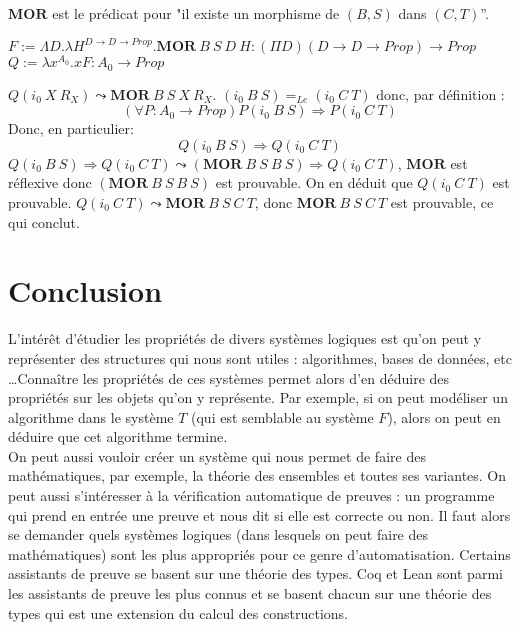 \documentclass[a4paper,12pt]{article}
\theoremstyle{plain}
\begin{document}
$\mathbf{MOR}$ est le prédicat pour "il existe un morphisme de $(B,S)$ dans $(C,T)$''.

\begin{center}
$ F := \Lambda D. \lambda H^{D \to D \to \mathit{Prop}}. \mathbf{MOR} \ B \ S \ D \ H : (\Pi D)(D \to D \to \mathit{Prop}) \to \mathit{Prop}$\\[3mm]
$ Q := \lambda x^{A_0}. x F : A_0 \to \mathit{Prop}$
\end{center}
\vspace{4mm}

$Q (i_0 \ X \ R_X) \leadsto \mathbf{MOR} \ B \ S \ X \ R_X$. $( i_0 \ B \ S) =_{\mathit{Le}}( i_0 \ C \ T)$ donc, par définition :
$$ (\forall P : A_0 \to \mathit{Prop}) P( i_0 \ B \ S) \Rightarrow P( i_0 \ C \ T)$$
Donc, en particulier: 
$$ Q( i_0 \ B \ S) \Rightarrow Q( i_0 \ C \ T)$$
$ Q( i_0 \ B \ S) \Rightarrow Q( i_0 \ C \ T) \leadsto (\mathbf{MOR} \ B \ S \ B \ S) \Rightarrow Q( i_0 \ C \ T)$, $\mathbf{MOR}$ est réflexive donc $(\mathbf{MOR} \ B \ S \ B \ S)$ est prouvable. On en déduit que $Q( i_0 \ C \ T)$ est prouvable. $Q( i_0 \ C \ T) \leadsto \mathbf{MOR} \ B \ S \ C \ T$, donc $\mathbf{MOR} \ B \ S \ C \ T$ est prouvable, ce qui conclut.

\clearpage

\section*{Conclusion}

L'intérêt d'étudier les propriétés de divers systèmes logiques est qu'on peut y représenter des structures qui nous sont utiles : algorithmes, bases de données, etc \ldots Connaître les propriétés de ces systèmes permet alors d'en déduire des propriétés sur les objets qu'on y représente. Par exemple, si on peut modéliser un algorithme dans le système $T$ (qui est semblable au système $F$), alors on peut en déduire que cet algorithme termine.\\

On peut aussi vouloir créer un système qui nous permet de faire des mathématiques, par exemple, la théorie des ensembles et toutes ses variantes. On peut aussi s'intéresser à la vérification automatique de preuves : un programme qui prend en entrée une preuve et nous dit si elle est correcte ou non. Il faut alors se demander quels systèmes logiques (dans lesquels on peut faire des mathématiques) sont les plus appropriés pour ce genre d'automatisation. Certains assistants de preuve se basent sur une théorie des types. Coq et Lean sont parmi les assistants de preuve les plus connus et se basent chacun sur une théorie des types qui est une extension du calcul des constructions.\\
\end{document}
